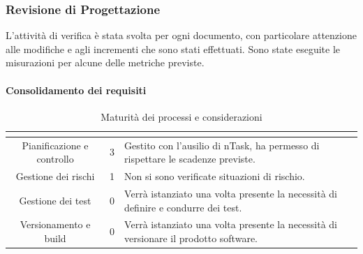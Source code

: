 \subsubsection{Revisione di Progettazione}
L'attività di verifica è stata svolta per ogni documento, con particolare attenzione alle modifiche e agli incrementi che sono stati effettuati. Sono state eseguite le misurazioni per alcune delle metriche previste.
\paragraph{Consolidamento dei requisiti}\MiniSpazio
\renewcommand{\arraystretch}{1.5}
\begin{table}[H]
	\begin{center}
		\begin{tabular}{|c|c|p{6.8cm}|}
			\hline
			\rowcolor{title_row}
			\textbf{\color{title_text}{Processo}} & \textbf{\color{title_text}{Livello di maturità}} & \textbf{\color{title_text}{Considerazioni}} \\
			\hline
			{Pianificazione e controllo} & {3} & {Gestito con l'ausilio di nTask, ha permesso di rispettare le scadenze previste.}\\	
			\hline
			{Gestione dei rischi} & {1} & {Non si sono verificate situazioni di rischio.}\\	
			\hline
			{Gestione dei test} & {0} & {Verrà istanziato una volta presente la necessità di definire e condurre dei test.}\\	
			\hline
			{Versionamento e build} & {0} & {Verrà istanziato una volta presente la necessità di versionare il prodotto software.}\\	
			\hline
		\end{tabular}
		\caption[Maturità dei processi, Consolidamento]{Maturità dei processi e considerazioni}	
		\label{tabella: considerazioni sulla maturità dei processi raggiunta}
	\end{center}
\end{table}

\pagebreak

